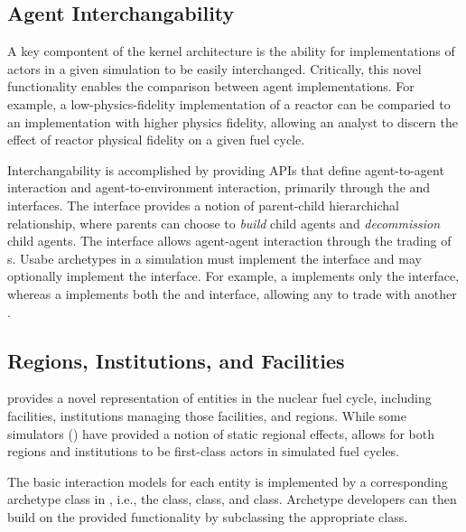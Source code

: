 \subsection{Agent Interchangability}\label{sec:interchangeability}

A key compontent of the \Cyclus kernel architecture is the ability for
implementations of actors in a given simulation to be easily
interchanged. Critically, this novel functionality enables the comparison
between agent implementations. For example, a low-physics-fidelity
implementation of a reactor can be comparied to an implementation with higher
physics fidelity, allowing an analyst to discern the effect of reactor physical
fidelity on a given fuel cycle. 

Interchangability is accomplished by providing APIs that define agent-to-agent
interaction and agent-to-environment interaction, primarily through the
 and  interfaces. The  interface
provides a notion of parent-child hierarchichal relationship, where parents can
choose to \textit{build} child agents and \textit{decommission} child
agents. The  interface allows agent-agent interaction through the
trading of s. Usabe archetypes in a \Cyclus simulation must
implement the  interface and may optionally implement the
 interface. For example, a  implements only the
 interface, whereas a  implements both the
 and  interface, allowing any  to
trade with another .

\subsection{Regions, Institutions, and Facilities}

\Cyclus provides a novel representation of entities in the nuclear fuel cycle,
including facilities, institutions managing those facilities, and regions. While
some simulators () have provided a notion of static regional
effects, \Cyclus allows for both regions and institutions to be first-class
actors in simulated fuel cycles.

The basic interaction models for each entity is implemented by a corresponding
archetype class in \Cyclus, i.e., the  class, 
class, and  class. Archetype developers can then build on the
provided functionality by subclassing the appropriate class.

